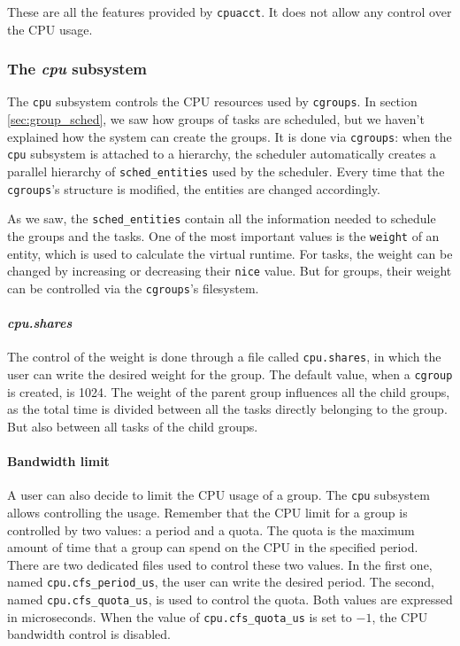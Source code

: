 These are all the features provided by \verb|cpuacct|. It does not allow any control over the CPU usage.

\subsubsection{The \textit{cpu} subsystem}

The \verb|cpu| subsystem controls the CPU resources used by \verb|cgroups|. In section \ref{sec:group_sched}, we saw how groups of tasks are scheduled, but we haven't explained how the system can create the groups. It is done via \verb|cgroups|: when the \verb|cpu| subsystem is attached to a hierarchy, the scheduler automatically creates a parallel hierarchy of \verb|sched_entities| used by the scheduler. Every time that the \verb|cgroups|'s structure is modified, the entities are changed accordingly. 

As we saw, the \verb|sched_entities| contain all the information needed to schedule the groups and the tasks. One of the most important values is the \verb|weight| of an entity, which is used to calculate the virtual runtime. For tasks, the weight can be changed by increasing or decreasing their \verb|nice| value. But for groups, their weight can be controlled via the \verb|cgroups|'s filesystem.

\paragraph{\textit{cpu.shares}}
The control of the weight is done through a file called \verb|cpu.shares|, in which the user can write the desired weight for the group. The default value, when a \verb|cgroup| is created, is 1024. The weight of the parent group influences all the child groups, as the total time is divided between all the tasks directly belonging to the group. But also between all tasks of the child groups.

\paragraph{Bandwidth limit}
A user can also decide to limit the CPU usage of a group. The \verb|cpu| subsystem allows controlling the usage. Remember that the CPU limit for a group is controlled by two values: a period and a quota. The quota is the maximum amount of time that a group can spend on the CPU in the specified period.  There are two dedicated files used to control these two values. In the first one, named \verb|cpu.cfs_period_us|, the user can write the desired period. The second, named \verb|cpu.cfs_quota_us|, is used to control the quota. Both values are expressed in microseconds. When the value of \verb|cpu.cfs_quota_us| is set to $-1$, the CPU bandwidth control is disabled.

